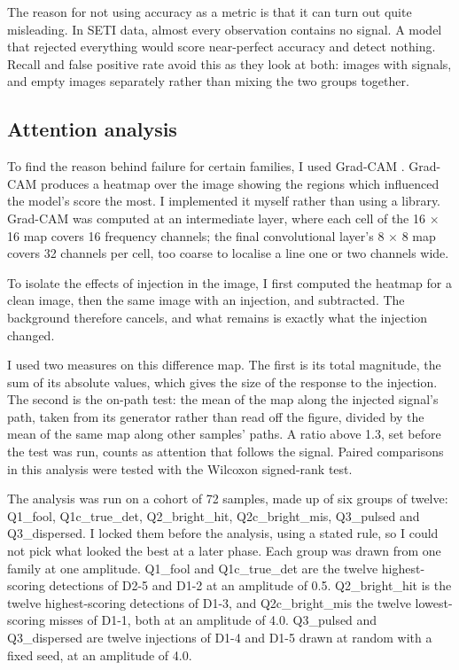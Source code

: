 \documentclass[11pt]{article}
\begin{document}
The reason for not using accuracy as a metric is that it can turn out quite misleading. In SETI data, almost every observation contains no signal. A model that rejected everything would score near-perfect accuracy and detect nothing. Recall and false positive rate avoid this as they look at both: images with signals, and empty images separately rather than mixing the two groups together.

\subsection{Attention analysis}
To find the reason behind failure for certain families, I used Grad-CAM \citep{selvaraju2017}. Grad-CAM produces a heatmap over the image showing the regions which influenced the model's score the most. I implemented it myself rather than using a library. Grad-CAM was computed at an intermediate layer, where each cell of the 16 $\times$ 16 map covers 16 frequency channels; the final convolutional layer's 8 $\times$ 8 map covers 32 channels per cell, too coarse to localise a line one or two channels wide.

To isolate the effects of injection in the image, I first computed the heatmap for a clean image, then the same image with an injection, and subtracted. The background therefore cancels, and what remains is exactly what the injection changed.

I used two measures on this difference map. The first is its total magnitude, the sum of its absolute values, which gives the size of the response to the injection. The second is the on-path test: the mean of the map along the injected signal's path, taken from its generator rather than read off the figure, divided by the mean of the same map along other samples' paths. A ratio above 1.3, set before the test was run, counts as attention that follows the signal. Paired comparisons in this analysis were tested with the Wilcoxon signed-rank test.

The analysis was run on a cohort of 72 samples, made up of six groups of twelve: Q1\_fool, Q1c\_true\_det, Q2\_bright\_hit, Q2c\_bright\_mis, Q3\_pulsed and Q3\_dispersed. I locked them before the analysis, using a stated rule, so I could not pick what looked the best at a later phase. Each group was drawn from one family at one amplitude. Q1\_fool and Q1c\_true\_det are the twelve highest-scoring detections of D2-5 and D1-2 at an amplitude of 0.5. Q2\_bright\_hit is the twelve highest-scoring detections of D1-3, and Q2c\_bright\_mis the twelve lowest-scoring misses of D1-1, both at an amplitude of 4.0. Q3\_pulsed and Q3\_dispersed are twelve injections of D1-4 and D1-5 drawn at random with a fixed seed, at an amplitude of 4.0.
\end{document}
